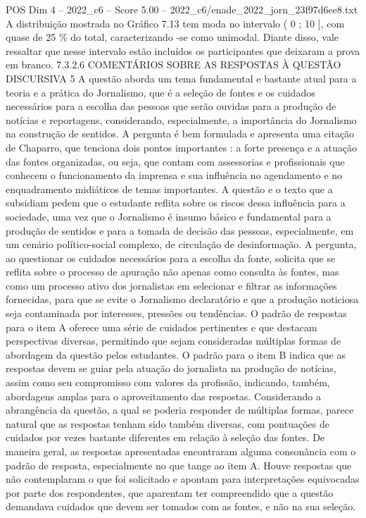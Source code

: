 \begin{textsample}{POS Dim 4 – 2022\_c6 – Score 5.00 – 2022\_c6/enade\_2022\_jorn\_23f97d6ee8.txt}
A distribuição mostrada no Gráfico 7.13 tem moda no intervalo ( 0 ; 10 ], com quase de 25 \% do total, caracterizando -se como unimodal.
Diante disso, vale ressaltar que nesse intervalo estão incluídos os participantes que deixaram a prova em branco. 7.3.2.6 COMENTÁRIOS SOBRE AS RESPOSTAS À QUESTÃO DISCURSIVA 5 A questão aborda um tema fundamental e bastante atual para a teoria e a prática do Jornalismo, que é a seleção de fontes e os cuidados necessários para a escolha das pessoas que serão ouvidas para a produção de notícias e reportagens, considerando, especialmente, a importância do Jornalismo na construção de sentidos.
A pergunta é bem formulada e apresenta uma citação de Chaparro, que tenciona dois pontos importantes : a forte presença e a atuação das fontes organizadas, ou seja, que contam com assessorias e profissionais que conhecem o funcionamento da imprensa e sua influência no agendamento e no enquadramento midiáticos de temas importantes.
A questão e o texto que a subsidiam pedem que o estudante reflita sobre os riscos dessa influência para a sociedade, uma vez que o Jornalismo é insumo básico e fundamental para a produção de sentidos e para a tomada de decisão das pessoas, especialmente, em um cenário político-social complexo, de circulação de desinformação.
A pergunta, ao questionar os cuidados necessários para a escolha da fonte, solicita que se reflita sobre o processo de apuração não apenas como consulta às fontes, mas como um processo ativo dos jornalistas em selecionar e filtrar as informações fornecidas, para que se evite o Jornalismo declaratório e que a produção noticiosa seja contaminada por interesses, pressões ou tendências.
O padrão de respostas para o item A oferece uma série de cuidados pertinentes e que destacam perspectivas diversas, permitindo que sejam consideradas múltiplas formas de abordagem da questão pelos estudantes.
O padrão para o item B indica que as respostas devem se guiar pela atuação do jornalista na produção de notícias, assim como seu compromisso com valores da profissão, indicando, também, abordagens amplas para o aproveitamento das respostas.
Considerando a abrangência da questão, a qual se poderia responder de múltiplas formas, parece natural que as respostas tenham sido também diversas, com pontuações de cuidados por vezes bastante diferentes em relação à seleção das fontes.
De maneira geral, as respostas apresentadas encontraram alguma consonância com o padrão de resposta, especialmente no que tange ao item A.
Houve respostas que não contemplaram o que foi solicitado e apontam para interpretações equivocadas por parte dos respondentes, que aparentam ter compreendido que a questão demandava cuidados que devem ser tomados com as fontes, e não na sua seleção.

\end{textsample}
